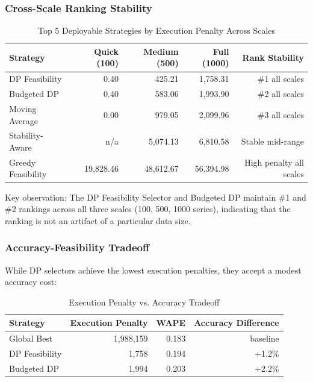 \subsubsection{Cross-Scale Ranking Stability}

\begin{table}[htbp]
\centering
\caption{Top 5 Deployable Strategies by Execution Penalty Across Scales}
\label{tab:cross-scale-ranking}
\begin{tabular}{lrrrr}
\toprule
\textbf{Strategy} & \textbf{Quick (100)} & \textbf{Medium (500)} & \textbf{Full (1000)} & \textbf{Rank Stability} \\
\midrule
DP Feasibility & 0.40 & 425.21 & 1,758.31 & \#1 all scales \\
Budgeted DP & 0.40 & 583.06 & 1,993.90 & \#2 all scales \\
Moving Average & 0.00 & 979.05 & 2,099.96 & \#3 all scales \\
Stability-Aware & n/a & 5,074.13 & 6,810.58 & Stable mid-range \\
Greedy Feasibility & 19,828.46 & 48,612.67 & 56,394.98 & High penalty all scales \\
\bottomrule
\end{tabular}
\end{table}

Key observation: The DP Feasibility Selector and Budgeted DP maintain \#1 and \#2 rankings across all three scales (100, 500, 1000 series), indicating that the ranking is not an artifact of a particular data size.

\subsubsection{Accuracy-Feasibility Tradeoff}

While DP selectors achieve the lowest execution penalties, they accept a modest accuracy cost:

\begin{table}[htbp]
\centering
\caption{Execution Penalty vs. Accuracy Tradeoff}
\label{tab:accuracy-penalty-tradeoff}
\begin{tabular}{lrr|r}
\toprule
\textbf{Strategy} & \textbf{Execution Penalty} & \textbf{WAPE} & \textbf{Accuracy Difference} \\
\midrule
Global Best & 1,988,159 & 0.183 & baseline \\
DP Feasibility & 1,758 & 0.194 & +1.2\% \\
Budgeted DP & 1,994 & 0.203 & +2.2\% \\
\bottomrule
\end{tabular}
\end{table}

